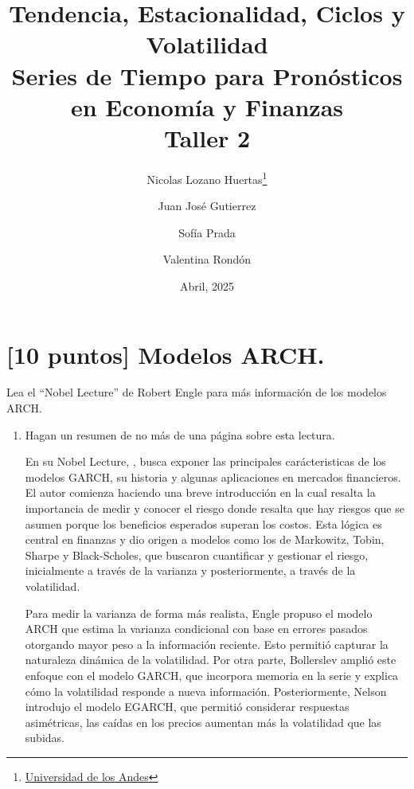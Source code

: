\documentclass{article}
\title{\textbf{Tendencia, Estacionalidad, Ciclos y Volatilidad} \\ {\Large Series de Tiempo para Pron\'osticos en Econom\'ia y Finanzas} \\ {\large Taller 2}}
\author{Nicolas Lozano Huertas\thanks{\href{mailto:n.lozanoh@uniandes.edu.co?subject= Taller 2 Series de Tiempo}{Universidad de los Andes}} \and Juan José Gutierrez \and Sof\'ia Prada \and Valentina Rond\'on}
\date{Abril, 2025}
\theoremstyle{remark}
\theoremstyle{definition}
\begin{document}
\maketitle
\vspace{-1 cm}
\section{[10 puntos] Modelos ARCH.}
{Lea el ``Nobel Lecture'' de Robert Engle para m\'as informaci\'on de los modelos ARCH.}
\begin{enumerate}[label = \emph{\alph*})]
    \item {Hagan un resumen de no m\'as de una p\'agina sobre esta lectura.}
        \begin{tcolorbox}[title=Soluci\'on 1.a]
            En su Nobel Lecture, \cite{engle2004}, busca exponer las principales car\'acteristicas de los modelos GARCH, su historia y algunas aplicaciones en mercados financieros. \\
            El autor comienza haciendo una breve introducci\'on en la cual resalta la importancia de medir y conocer el riesgo donde resalta que hay riesgos que se asumen porque los beneficios esperados superan los costos. Esta lógica es central en finanzas y dio origen a modelos como los de Markowitz, Tobin, Sharpe y Black-Scholes, que buscaron cuantificar y gestionar el riesgo, inicialmente a través de la varianza y posteriormente, a través de la volatilidad. 
            
            Para medir la varianza de forma más realista, Engle propuso el modelo ARCH que estima la varianza condicional con base en errores pasados otorgando mayor peso a la información reciente. Esto permitió capturar la naturaleza dinámica de la volatilidad. Por otra parte, Bollerslev amplió este enfoque con el modelo GARCH, que incorpora memoria en la serie y explica cómo la volatilidad responde a nueva información. Posteriormente, Nelson introdujo el modelo EGARCH, que permitió considerar respuestas asimétricas, las caídas en los precios aumentan más la volatilidad que las subidas. 
            

\end{tcolorbox}
\end{enumerate}
\end{document}
